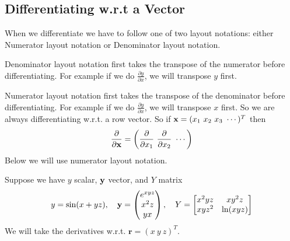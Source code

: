 \subsection{Differentiating w.r.t a Vector}
\begin{definition}
    When we differentiate we have to follow one of two layout notations: either Numerator layout notation or Denominator layout notation.

    \bigskip
    Denominator layout notation first takes the transpose of the numerator before differentiating. For example if we do $\frac{\partial y}{\partial x}$, we will transpose $y$ first.

    \bigskip
    Numerator layout notation first takes the transpose of the denominator before differentiating. For example if we do $\frac{\partial y}{\partial x}$, we will transpose $x$ first. So we are always differentiating w.r.t. a row vector. So if $\textbf{x} = (x_1 \ x_2 \ x_3 \ \cdots)^T$ then $$\frac{\partial}{\partial \x} = \left(\frac{\partial}{\partial x_1} \ \frac{\partial}{\partial x_2} \ \cdots\right)$$ Below we will use numerator layout notation.
\end{definition}
Suppose we have $y$ scalar, $\textbf{y}$ vector, and $Y$ matrix
$$y = \sin(x + yz), \quad \textbf{y} = \begin{pmatrix}
    e^{xyz} \\ x^2z \\ yx
\end{pmatrix}, \quad Y = \begin{bmatrix}
    x^2yz & xy^2z \\
    xyz^2 & \ln(xyz)
\end{bmatrix}$$
We will take the derivatives w.r.t. $\textbf{r} = (x \ y \ z)^T$.
